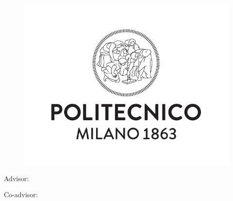 \begin{titlepage}
    \begin{center}
    	\Large
    	\spacedlowsmallcaps{\myUni} \\
    	\large
        \bigskip\myFaculty \\
        \medskip\mySchool \\
    	\medskip\myDepartment \\
    	\bigskip\myCourseFirstPart \\
        \medskip\myCourseSecondPart \\

        \hfill

        \vfill

        \begin{figure}[!h]
			\begin{center}
				\includegraphics[width=0.4\columnwidth]{Images/logoPoli.pdf}
			\end{center}
		\end{figure}

		\vfill

        \begingroup
       		\LARGE
            \myTitle
            \bigskip
        \endgroup

        \vfill

		\flushleft
		\normalsize{Advisor:}
		\medskip\spacedlowsmallcaps{\mySupervisor}

		\normalsize{Co-advisor:}
		\medskip\spacedlowsmallcaps{\myOtherSupervisor}\\


\end{center}
\end{titlepage}

